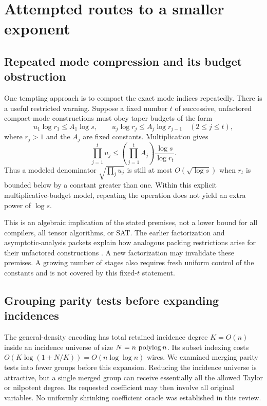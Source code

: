 \section{Attempted routes to a smaller exponent}
\label{sec:attempts}

\subsection{Repeated mode compression and its budget obstruction}

One tempting approach is to compact the exact mode indices repeatedly.
There is a useful restricted warning. Suppose a fixed number $t$ of
successive, unfactored compact-mode constructions must obey taper
budgets of the form
\[
 u_1\log r_1\le A_1\log s,\qquad
 u_j\log r_j\le A_j\log r_{j-1}\quad(2\le j\le t),
\]
where $r_j>1$ and the $A_j$ are fixed constants. Multiplication gives
\begin{equation}
 \prod_{j=1}^t u_j
 \le \left(\prod_{j=1}^t A_j\right)
       \frac{\log s}{\log r_t}.
 \label{eq:telescope}
\end{equation}
Thus a modeled denominator $\sqrt{\prod_j u_j}$ is still at most
$O(\sqrt{\log s})$ when $r_t$ is bounded below by a constant greater
than one. Within this explicit multiplicative-budget model,
repeating the operation does not yield an extra power of $\log s$.

This is an algebraic implication of the stated premises, not a lower
bound for all compilers, all tensor algorithms, or SAT. The earlier
factorization and asymptotic-analysis packets explain how analogous
packing restrictions arise for their unfactored constructions
\cite{factorization,barriers}. A new factorization may invalidate
these premises. A growing number of stages also requires fresh
uniform control of the constants and is not covered by this
fixed-$t$ statement.

\subsection{Grouping parity tests before expanding incidences}

The general-density encoding has total retained incidence degree
$K=O(n)$ inside an incidence universe of size $N=n\,\operatorname{polylog} n$.
Its subset indexing costs
$O(K\log(1+N/K))=O(n\log\log n)$ wires.
We examined merging parity tests into fewer groups before this
expansion. Reducing the incidence universe is attractive, but a
single merged group can receive essentially all the allowed Taylor
or nilpotent degree. Its requested coefficient may then involve
all original variables. No uniformly shrinking coefficient oracle
was established in this review.

